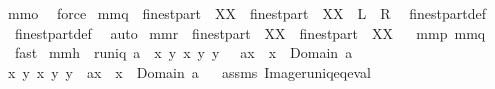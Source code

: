 \begin{isabellebody}
mm{}{}o\ \isamarkupfalse%
\ force%
\endisatagproof
{\isafoldproof}%
%
\isadelimproof
%
\endisadelimproof
\isanewline
{}\isamarkupfalse%
\ mm{}{}q{\isacharcolon}\ {\isachardoublequoteopen}{\isasymUnion}\ {\isacharparenleft}finestpart\ {\isacharbackquote}\ XX{\isacharparenright}\ {\isasymsupseteq}\ finestpart\ {\isacharparenleft}{\isasymUnion}\ XX{\isacharparenright}{\isachardoublequoteclose}\ {\isacharparenleft}\ {\isachardoublequoteopen}{\isacharquery}L\ {\isasymsupseteq}\ {\isacharquery}R{\isachardoublequoteclose}{\isacharparenright}\ \isanewline
%
\isadelimproof
%
\endisadelimproof
%
\isatagproof
{}\isamarkupfalse%
\ finestpart{\isacharunderscore}def\ \isamarkupfalse%
\ finestpart{\isacharunderscore}def\ \isamarkupfalse%
\ auto%
\endisatagproof
{\isafoldproof}%
%
\isadelimproof
\isanewline
%
\endisadelimproof
\isanewline
{}\isamarkupfalse%
\ mm{}{}r{\isacharcolon}\ {\isachardoublequoteopen}{\isasymUnion}\ {\isacharparenleft}finestpart\ {\isacharbackquote}\ XX{\isacharparenright}\ {\isacharequal}\ finestpart\ {\isacharparenleft}{\isasymUnion}\ XX{\isacharparenright}{\isachardoublequoteclose}%
\isadelimproof
\ %
\endisadelimproof
%
\isatagproof
{}\isamarkupfalse%
\ mm{}{}p\ mm{}{}q\ \isamarkupfalse%
\ fast%
\endisatagproof
{\isafoldproof}%
%
\isadelimproof
%
\endisadelimproof
\isanewline
\isanewline
{}\isamarkupfalse%
\ mm{}{}h{\isacharcolon}\ \ {\isachardoublequoteopen}runiq\ a{\isachardoublequoteclose}\ \ {\isachardoublequoteopen}{\isacharbraceleft}{\isacharparenleft}x{\isacharcomma}\ {\isacharbraceleft}y{\isacharbraceright}{\isacharparenright}{\isacharbar}\ x\ y{\isachardot}\ y\ {\isasymin}\ {\isasymUnion}\ {\isacharparenleft}a{\isacharbackquote}{\isacharbackquote}{\isacharbraceleft}x{\isacharbraceright}{\isacharparenright}\ {\isacharampersand}\ x\ {\isasymin}\ Domain\ a{\isacharbraceright}\ {\isacharequal}\ \isanewline
{\isacharbraceleft}{\isacharparenleft}x{\isacharcomma}\ {\isacharbraceleft}y{\isacharbraceright}{\isacharparenright}{\isacharbar}\ x\ y{\isachardot}\ y\ {\isasymin}\ a{\isacharcomma}{\isacharcomma}x\ {\isacharampersand}\ x\ {\isasymin}\ Domain\ a{\isacharbraceright}{\isachardoublequoteclose}%
\isadelimproof
\ %
\endisadelimproof
%
\isatagproof
{}\isamarkupfalse%
\ assms\ Image{\isacharunderscore}runiq{\isacharunderscore}eq{\isacharunderscore}eval\ \isanewline

\end{isabellebody}
